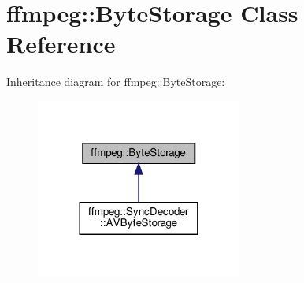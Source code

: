 \hypertarget{classffmpeg_1_1ByteStorage}{}\section{ffmpeg\+:\+:Byte\+Storage Class Reference}
\label{classffmpeg_1_1ByteStorage}


Inheritance diagram for ffmpeg\+:\+:Byte\+Storage\+:
\nopagebreak
\begin{figure}[H]
\begin{center}
\leavevmode
\includegraphics[width=192pt]{classffmpeg_1_1ByteStorage__inherit__graph}
\end{center}
\end{figure}
